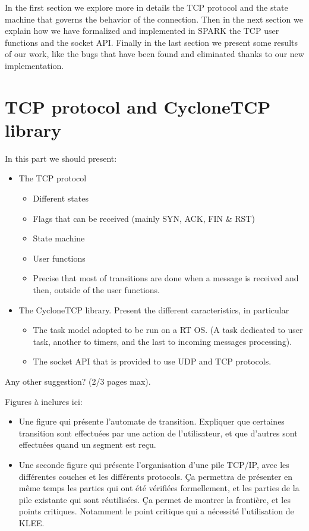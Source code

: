 \documentclass[runningheads]{llncs}
\begin{document}
    In the first section we explore more in details the TCP protocol and the state machine that governs the behavior of the connection.
    Then in the next section we explain how we have formalized and implemented in SPARK the TCP user functions and the socket API.
    Finally in the last section we present some results of our work, like the bugs that have been found and eliminated thanks to our
    new implementation.


\section{TCP protocol and CycloneTCP library}
\label{sec:TCP}

    In this part we should present:
    \begin{itemize}
        \item The TCP protocol
        \begin{itemize}
            \item Different states
            \item Flags that can be received (mainly SYN, ACK, FIN \& RST)
            \item State machine
            \item User functions
            \item Precise that most of transitions are done when a message is received and then, outside of the user functions.
        \end{itemize}
        \item The CycloneTCP library. Present the different caracteristics, in particular
        \begin{itemize}
            \item The task model adopted to be run on a RT OS. (A task dedicated to user task, another to timers, and the last to incoming messages processing).
            \item The socket API that is provided to use UDP and TCP protocols.
        \end{itemize}
    \end{itemize}
    
    Any other suggestion? (2/3 pages max).

    Figures à inclures ici:
    \begin{itemize}
        \item Une figure qui présente l'automate de transition. Expliquer que certaines transition sont effectuées par une action de l'utilisateur,
              et que d'autres sont effectuées quand un segment est reçu.
        \item Une seconde figure qui présente l'organisation d'une pile TCP/IP, avec les différentes couches et les différents protocols.
              Ça permettra de présenter en même temps les parties qui ont été vérifiées formellement, et les parties de la pile existante qui
              sont réutilisées. Ça permet de montrer la frontière, et les points critiques. Notamment le point critique qui a nécessité l'utilisation
              de KLEE.
    \end{itemize}
\end{document}
